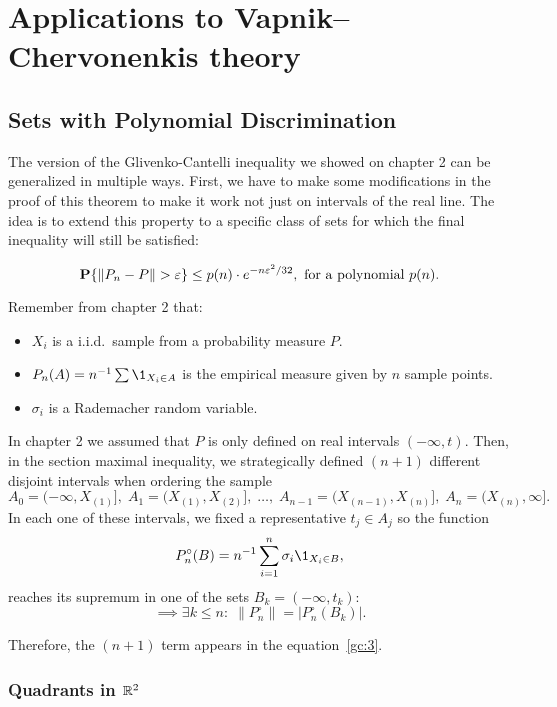 \chapter{Applications to Vapnik–Chervonenkis theory}

\section{Sets with Polynomial Discrimination}

The version of the Glivenko-Cantelli inequality we showed on chapter 2 can be generalized in multiple ways. First, we have to make some modifications in the proof of this theorem to make it work not just on intervals of the real line. The idea is to extend this property to a specific class of sets for which the final inequality will still be satisfied:

\begin{equation}
    \label{vc:1}
    \P\{\|P_n-P\| > \varepsilon\} \leq p(n) \cdot e^{-n \varepsilon^2 / 32}, \text{ for a polynomial } p(n).
\end{equation}

Remember from chapter 2 that:
\begin{itemize}
    \item $X_i$ is a i.i.d.~sample from a probability measure $P$.
    \item $P_n(A) = n^{-1}\sum \1_{X_i \in A} $ is the empirical measure given by $n$ sample points. 
    \item $\sigma_i$ is a Rademacher random variable.
\end{itemize}

In chapter 2 we assumed that $P$ is only defined on real intervals $(-\infty, t)$. Then, in the section maximal inequality, we strategically defined $(n+1)$ different disjoint intervals when ordering the sample
\[A_0 = (-\infty, X_{(1)}],\; A_1 = (X_{(1)}, X_{(2)}],\; \ldots,\; A_{n-1} = (X_{(n-1)}, X_{(n)}],\; A_n = (X_{(n)}, \infty].  \] %
In each one of these intervals, we fixed a representative $t_j \in A_j$ so the function
\[ P_n^{\circ}(B) = n^{-1} \sum_{i = 1}^n \sigma_i \1_{X_i \in B}, \] 
reaches its supremum in one of the sets $B_k = (-\infty, t_k)$:
\[ \implies \exists k\leq n :\; \|P_n^\circ\| = |P_n^\circ(B_k)|.  \] 

Therefore, the $(n+1)$ term appears in the equation~\ref{gc:3}.

\vspace*{1em}

\subsection*{Quadrants in $\mathbb{R}^2$}

